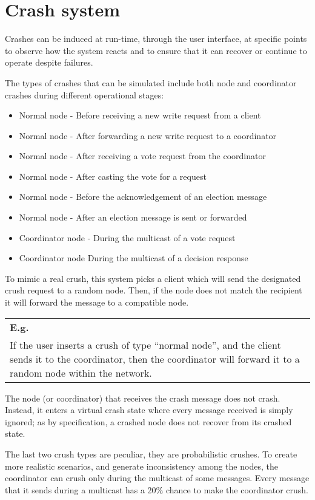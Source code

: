 \section{Crash system}

Crashes can be induced at run-time, through the user interface, at specific points to observe how the system reacts and to ensure that it can recover or continue to operate despite failures. 

The types of crashes that can be simulated include both node and coordinator crashes during different operational stages:
\begin{itemize}
    \item Normal node - Before receiving a new write request from a client
    \item Normal node - After forwarding a new write request to a coordinator
    \item Normal node - After receiving a vote request from the coordinator
    \item Normal node - After casting the vote for a request
    \item Normal node - Before the acknowledgement of an election message
    \item  Normal node - After an election message is sent or forwarded
    \item Coordinator node - During the multicast of a vote request
    \item Coordinator node During the multicast of a decision response
\end{itemize}


To mimic a real crush, this system picks a client which will send the designated crush request to a random node. Then, if the node does not match the recipient it will forward the message to a compatible node. 
\begin{center}
    \begin{tabular}{|p{}|}
        \hline
        \textbf{E.g.}\\
        If the user inserts a crush of type ``normal node'', and the client sends it to the coordinator, then the coordinator will forward it to a random node within the network.\\
        \hline
    \end{tabular} 
\end{center}

The node (or coordinator) that receives the crash message does not crash. Instead, it enters a virtual crash state where every message received is simply ignored; as by specification, a crashed node does not recover from its crashed state.

The last two crush types are peculiar, they are probabilistic crushes. To create more realistic scenarios, and generate inconsistency among the nodes, the coordinator can crush only during the multicast of some messages. Every message that it sends during a multicast has a 20\% chance to make the coordinator crush.
